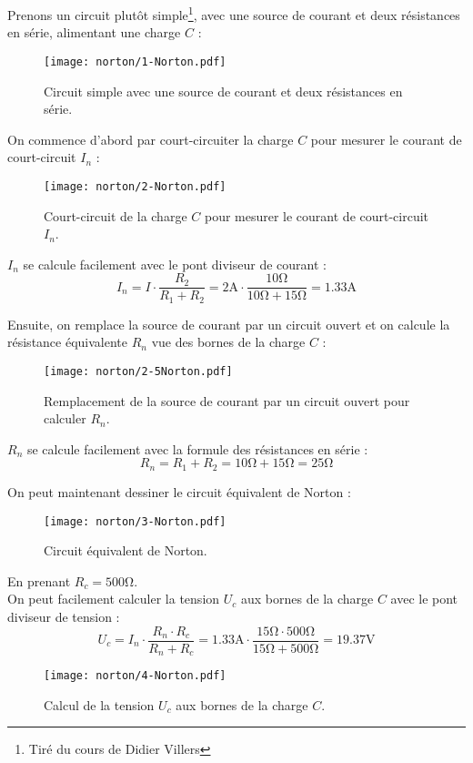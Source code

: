 Prenons un circuit plut\^ot simple\footnote{Tir\'e du cours de Didier Villers}, avec une source de courant et deux r\'esistances
en s\'erie, alimentant une charge \(C\) :
\begin{figure}[H]
    \centering
    \texttt{[image: norton/1-Norton.pdf]}
    \caption{Circuit simple avec une source de courant et deux r\'esistances en s\'erie.}
\end{figure}

On commence d'abord par court-circuiter la charge \(C\) pour mesurer le courant de court-circuit \(I_{n}\) :
\begin{figure}[H]
    \centering
    \texttt{[image: norton/2-Norton.pdf]}
    \caption{Court-circuit de la charge \(C\) pour mesurer le courant de court-circuit \(I_{n}\).}
\end{figure}

\(I_{n}\) se calcule facilement avec le pont diviseur de courant :
\[
I_{n} = I \cdot \frac{R_{2}}{R_{1}+R_{2}} = 2\unit{\ampere} \cdot \frac{10\unit{\ohm}}{10\unit{\ohm}+15\unit{\ohm}} = 1.33\unit{\ampere}
\]

Ensuite, on remplace la source de courant par un circuit ouvert et on calcule la
résistance équivalente \(R_{n}\) vue des bornes de la charge \(C\) :
\begin{figure}[H]
    \centering
    \texttt{[image: norton/2-5Norton.pdf]}
    \caption{Remplacement de la source de courant par un circuit ouvert pour calculer \(R_{n}\).}
\end{figure}

\(R_{n}\) se calcule facilement avec la formule des résistances en série :
\[
R_{n} = R_{1} + R_{2} = 10\unit{\ohm} + 15\unit{\ohm} = 25\unit{\ohm}
\]

On peut maintenant dessiner le circuit équivalent de Norton :
\begin{figure}[H]
    \centering
    \texttt{[image: norton/3-Norton.pdf]}
    \caption{Circuit équivalent de Norton.}
    \label{fig:norton-equivalent}
\end{figure}
En prenant \(R_c=500\unit{\ohm}\).\\
On peut facilement calculer la tension \(U_{c}\) aux bornes de la charge \(C\) avec le pont diviseur de tension :
\[
U_{c} = I_{n} \cdot \frac{R_{n} \cdot R_{c}}{R_{n} + R_{c}} = 1.33\unit{\ampere} \cdot \frac{15\unit{\ohm} \cdot 500\unit{\ohm}}{15\unit{\ohm} + 500\unit{\ohm}} = 19.37\unit{\volt}
\]

\begin{figure}[H]
	\centering
    \texttt{[image: norton/4-Norton.pdf]}
    \caption{Calcul de la tension \(U_{c}\) aux bornes de la charge \(C\).}
\end{figure}

